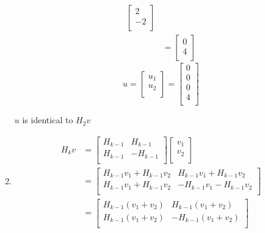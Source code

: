 \documentclass[11pt]{article}
\begin{document}
\begin{enumerate}
\begin{align*}
				\begin{bmatrix} 
					2  \\ 
					-2 \\
				\end{bmatrix}	\\
			&= 
				\begin{bmatrix} 
					0  \\ 
					4 \\
				\end{bmatrix}					
	\end{align*}
	\[
		u =
		\begin{bmatrix}
			u_1 \\
			u_2 \\
		\end{bmatrix}
		=
		\begin{bmatrix}
			0 \\
			0 \\
			0 \\
			4 \\
		\end{bmatrix}		
	\]
	
	$u$ is identical to $H_2v$
	
	\item
	\begin{align*}
		H_kv &= 			
				\begin{bmatrix} 
					H_{k-1} & H_{k-1} \\ 
					H_{k-1} & -H_{k-1} \\ 
				\end{bmatrix}
				\begin{bmatrix}
					v_1 \\
					v_2 \\
				\end{bmatrix} \\
			&= 
				\begin{bmatrix} 
					H_{k-1}v_1 + H_{k-1} v_2 & H_{k-1} v_1 + H_{k-1} v_2\\ 
					H_{k-1}v_1 + H_{k-1} v_2&  -H_{k-1}v_1 - H_{k-1} v_2 \\ 
				\end{bmatrix}	\\
			&= 		
				\begin{bmatrix} 
					H_{k-1}(v_1 + v_2) & H_{k-1}(v_1 + v_2) \\ 
					H_{k-1}(v_1 + v_2) &  -H_{k-1}(v_1 + v_2)  \\ 
				\end{bmatrix}	
	\end{align*}
\end{enumerate}
\end{document}
